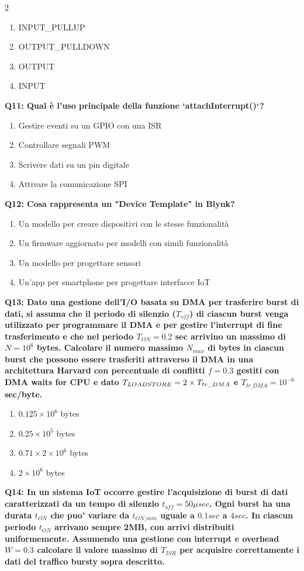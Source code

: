 \documentclass[10pt]{article}
\begin{document}
\begin{multicols}{2}
\begin{enumerate}[label=\arabic*.]
\item INPUT\_PULLUP
\item OUTPUT\_PULLDOWN
\item OUTPUT
\item INPUT
\end{enumerate}
\textbf{Q11: Qual è l’uso principale della funzione `attachInterrupt()`?}

\begin{enumerate}[label=\arabic*.]
\item Gestire eventi su un GPIO con una ISR
\item Controllare segnali PWM
\item Scrivere dati su un pin digitale
\item Attivare la comunicazione SPI
\end{enumerate}
\textbf{Q12: Cosa rappresenta un "Device Template" in Blynk?}

\begin{enumerate}[label=\arabic*.]
\item Un modello per creare dispositivi con le stesse funzionalità
\item Un firmware aggiornato per modelli con simili funzionalità
\item Un modello per progettare sensori
\item Un'app per smartphone per progettare interfacce IoT
\end{enumerate}
\textbf{Q13: Dato una gestione dell’I/O basata su DMA per trasferire burst di dati, si assuma che il periodo di silenzio  ($T_{off}$) di ciascun burst venga utilizzato per programmare il DMA e per gestire l’interrupt di fine trasferimento e che nel periodo $T_{ON} = 0.2$ sec arrivino un massimo di $N=10^6$ bytes. Calcolare il numero massimo $N_{max}$ di bytes in ciascun burst che possono essere trasferiti attraverso il DMA in una architettura Harvard con percentuale di conflitti $f = 0.3$ gestiti con DMA waits for CPU e dato $T_{LOAD\/STORE} = 2 \times T_{tr\_DMA}$ e $T_{tr\_DMA} = 10^{-6}$ sec/byte.}

\begin{enumerate}[label=\arabic*.]
\item $0.125 \times 10^6$ bytes
\item $0.25 \times 10^5$ bytes
\item $0.71 \times 2 \times 10^6$ bytes
\item $2 \times 10^6$ bytes
\end{enumerate}
\textbf{Q14: In un sistema IoT occorre gestire l'acquisizione di burst di dati caratterizzati da un tempo di silenzio $t_{off}=50\mu sec$. Ogni burst ha una durata $t_{ON}$ che puo' variare da $t_{ON\_min}$ uguale a $0.1 sec$ a $4 sec$. In ciascun periodo $t_{ON}$ arrivano sempre 2MB, con arrivi distribuiti uniformemente.  Assumendo una gestione con interrupt e overhead $W=0.3$ calcolare il valore massimo di $T_{ISR}$ per acquisire correttamente i dati del traffico bursty sopra descritto.}


\end{multicols}
\end{document}
